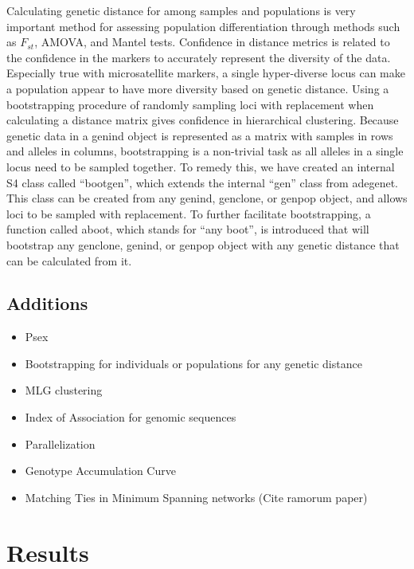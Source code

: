 \documentclass{frontiersSCNS} %
\begin{document}
Calculating genetic distance for among samples and populations is very
important method for assessing population differentiation through
methods such as \(F_{st}\), AMOVA, and Mantel tests. Confidence in
distance metrics is related to the confidence in the markers to
accurately represent the diversity of the data. Especially true with
microsatellite markers, a single hyper-diverse locus can make a
population appear to have more diversity based on genetic distance.
Using a bootstrapping procedure of randomly sampling loci with
replacement when calculating a distance matrix gives confidence in
hierarchical clustering. Because genetic data in a genind object is
represented as a matrix with samples in rows and alleles in columns,
bootstrapping is a non-trivial task as all alleles in a single locus
need to be sampled together. To remedy this, we have created an internal
S4 class called ``bootgen'', which extends the internal ``gen'' class
from adegenet. This class can be created from any genind, genclone, or
genpop object, and allows loci to be sampled with replacement. To
further facilitate bootstrapping, a function called aboot, which stands
for ``any boot'', is introduced that will bootstrap any genclone,
genind, or genpop object with any genetic distance that can be
calculated from it.

\subsection*{Additions}\label{additions}

\begin{itemize}
\itemsep1pt\parskip0pt
\item
  Psex
\item
  Bootstrapping for individuals or populations for any genetic distance
\item
  MLG clustering
\item
  Index of Association for genomic sequences
\item
  Parallelization
\item
  Genotype Accumulation Curve
\item
  Matching Ties in Minimum Spanning networks (Cite ramorum paper)
\end{itemize}

\section*{Results}\label{results}
\end{document}
